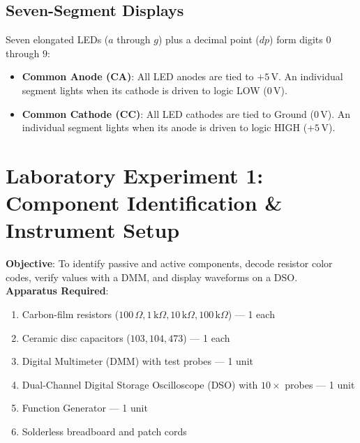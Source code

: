 \subsection{Seven-Segment Displays}
Seven elongated LEDs ($a$ through $g$) plus a decimal point ($dp$) form digits $0$ through $9$:
\begin{itemize}
    \item \textbf{Common Anode (CA)}: All LED anodes are tied to $+5\,\mathrm{V}$. An individual segment lights when its cathode is driven to logic LOW ($0\,\mathrm{V}$).
    \item \textbf{Common Cathode (CC)}: All LED cathodes are tied to Ground ($0\,\mathrm{V}$). An individual segment lights when its anode is driven to logic HIGH ($+5\,\mathrm{V}$).
\end{itemize}

\section{Laboratory Experiment 1: Component Identification \& Instrument Setup}
\begin{definition}
\textbf{Objective}: To identify passive and active components, decode resistor color codes, verify values with a DMM, and display waveforms on a DSO.\\
\textbf{Apparatus Required}:
\begin{enumerate}
    \item Carbon-film resistors ($100\,\Omega, 1\,\mathrm{k}\Omega, 10\,\mathrm{k}\Omega, 100\,\mathrm{k}\Omega$) --- 1 each
    \item Ceramic disc capacitors ($103, 104, 473$) --- 1 each
    \item Digital Multimeter (DMM) with test probes --- 1 unit
    \item Dual-Channel Digital Storage Oscilloscope (DSO) with $10\times$ probes --- 1 unit
    \item Function Generator --- 1 unit
    \item Solderless breadboard and patch cords
\end{enumerate}
\end{definition}


